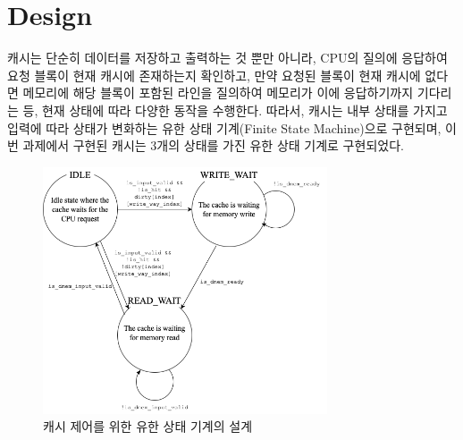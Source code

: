 \documentclass[openright, a4paper]{article}
\begin{document}

\section{Design}
캐시는 단순히 데이터를 저장하고 출력하는 것 뿐만 아니라, CPU의 질의에 응답하여
요청 블록이 현재 캐시에 존재하는지 확인하고, 만약 요청된 블록이 현재 캐시에 
없다면 메모리에 해당 블록이 포함된 라인을 질의하여 메모리가 이에 응답하기까지
기다리는 등, 현재 상태에 따라 다양한 동작을 수행한다. 따라서, 캐시는 내부 상태를
가지고 입력에 따라 상태가 변화하는 유한 상태 기계(Finite State Machine)으로 
구현되며, 이번 과제에서 구현된 캐시는 3개의 상태를 가진 유한 상태 기계로 
구현되었다.

\hfill

{
    \begin{figure}[!h]
        \centering
        \includegraphics[width=0.75\textwidth]{img/diagram.png}
        \caption{캐시 제어를 위한 유한 상태 기계의 설계}
    \end{figure}
}

\hfill
\end{document}
